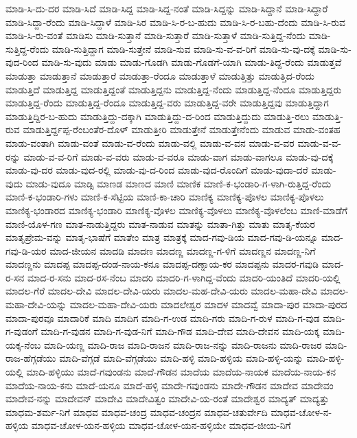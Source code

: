 ಮಾಡಿ-ಸಿ-ದು-ದರ
ಮಾಡಿ-ಸಿದೆ
ಮಾಡಿ-ಸಿದ್ದ
ಮಾಡಿ-ಸಿದ್ದ-ನಂತೆ
ಮಾಡಿ-ಸಿದ್ದನ್ನು
ಮಾಡಿ-ಸಿದ್ದಾನೆ
ಮಾಡಿ-ಸಿದ್ದಾರೆ
ಮಾಡಿ-ಸಿದ್ದಾ-ರೆಂದು
ಮಾಡಿ-ಸಿದ್ದಾಳೆ
ಮಾಡಿ-ಸಿರ
ಮಾಡಿ-ಸಿ-ರ-ಬ-ಹುದು
ಮಾಡಿ-ಸಿ-ರ-ಬಹು-ದೆಂದು
ಮಾಡಿ-ಸಿ-ರುವ
ಮಾಡಿ-ಸಿ-ರು-ವಂತೆ
ಮಾಡಿಸು
ಮಾಡಿ-ಸುತ್ತಾನೆ
ಮಾಡಿ-ಸುತ್ತಾರೆ
ಮಾಡಿ-ಸುತ್ತಾಳೆ
ಮಾಡಿ-ಸುತ್ತಿದ್ದ-ನೆಂದು
ಮಾಡಿ-ಸುತ್ತಿದ್ದ-ರೆಂದು
ಮಾಡಿ-ಸುತ್ತಿದ್ದಾಗ
ಮಾಡಿ-ಸುತ್ತೇನೆ
ಮಾಡಿ-ಸುವ
ಮಾಡಿ-ಸು-ವ-ವ-ರಿಗೆ
ಮಾಡಿ-ಸು-ವು-ದಕ್ಕೆ
ಮಾಡಿ-ಸು-ವುದ-ರಿಂದ
ಮಾಡಿ-ಸು-ವುದು
ಮಾಡು
ಮಾಡು-ಗೊಡಗಿ
ಮಾಡು-ಗೊಡಗೆ-ಯಾಗಿ
ಮಾಡು-ತಿದ್ದ-ರೆಂದು
ಮಾಡುತ್ತವೆ
ಮಾಡುತ್ತಾ
ಮಾಡುತ್ತಾನೆ
ಮಾಡುತ್ತಾರೆ
ಮಾಡುತ್ತಾ-ರೆಂದೂ
ಮಾಡುತ್ತಾಳೆ
ಮಾಡುತ್ತಿತ್ತು
ಮಾಡುತ್ತಿದ-ರೆಂದು
ಮಾಡುತ್ತಿದೆ
ಮಾಡುತ್ತಿದ್ದ
ಮಾಡುತ್ತಿದ್ದಂತೆ
ಮಾಡುತ್ತಿದ್ದನು
ಮಾಡುತ್ತಿದ್ದ-ನೆಂದು
ಮಾಡುತ್ತಿದ್ದ-ನೆಂದೂ
ಮಾಡುತ್ತಿದ್ದರು
ಮಾಡುತ್ತಿದ್ದ-ರೆಂದು
ಮಾಡುತ್ತಿದ್ದ-ರೆಂದೂ
ಮಾಡುತ್ತಿದ್ದ-ವರು
ಮಾಡುತ್ತಿದ್ದ-ವರೇ
ಮಾಡುತ್ತಿದ್ದವು
ಮಾಡುತ್ತಿದ್ದಾಗ
ಮಾಡುತ್ತಿದ್ದಿರ-ಬ-ಹುದು
ಮಾಡುತ್ತಿದ್ದು-ದಕ್ಕಾಗಿ
ಮಾಡುತ್ತಿದ್ದು-ದ-ರಿಂದ
ಮಾಡುತ್ತಿದ್ದುದು
ಮಾಡುತ್ತಿ-ರಲು
ಮಾಡುತ್ತಿ-ರುವ
ಮಾಡುತ್ತಿರ್ದ್ದಪ್ಪ-ರೆಂಬಂತೆರ-ದೊಳ್
ಮಾಡುತ್ತೀರಿ
ಮಾಡುತ್ತೇನೆ
ಮಾಡುತ್ತೇನೆಂದು
ಮಾಡುವ
ಮಾಡು-ವಂತಹ
ಮಾಡು-ವಂತಾಗಿ
ಮಾಡು-ವಂತೆ
ಮಾಡು-ವ-ರೆಂದು
ಮಾಡು-ವಲ್ಲಿ
ಮಾಡು-ವ-ವನ
ಮಾಡು-ವ-ವರ
ಮಾಡು-ವ-ವ-ರನ್ನು
ಮಾಡು-ವ-ವ-ರಿಗೆ
ಮಾಡು-ವ-ವರು
ಮಾಡು-ವ-ವರೂ
ಮಾಡು-ವಾಗ
ಮಾಡು-ವಾಗಲೂ
ಮಾಡು-ವು-ದಕ್ಕೆ
ಮಾಡು-ವು-ದರ
ಮಾಡು-ವುದ-ರಲ್ಲಿ
ಮಾಡು-ವು-ದ-ರಿಂದ
ಮಾಡು-ವುದ-ರೊಂದಿಗೆ
ಮಾಡು-ವುದಾ-ದರೆ
ಮಾಡು-ವುದು
ಮಾಡು-ವುದೂ
ಮಾಡ್ಸಿ
ಮಾಣಡ
ಮಾಣದ
ಮಾಣಿ
ಮಾಣಿಕ
ಮಾಣಿ-ಕ-ಭಂಡಾರಿ-ಗ-ಳಾಗಿ-ರುತ್ತಿದ್ದ-ರೆಂದು
ಮಾಣಿ-ಕ-ಭಂಡಾರಿ-ಗಳು
ಮಾಣಿ-ಕ-ಸೆಟ್ಟಿಯ
ಮಾಣಿ-ಕಾ-ಚಾರಿ
ಮಾಣಿಕ್ಯ
ಮಾಣಿಕ್ಯ-ಪೊಳಲ
ಮಾಣಿಕ್ಯ-ಪೊಳಲು
ಮಾಣಿಕ್ಯ-ಭಂಡಾರದ
ಮಾಣಿಕ್ಯ-ಭಂಡಾರಿ
ಮಾಣಿಕ್ಯ-ವೊಳಲ
ಮಾಣಿಕ್ಯ-ವೊಳಲು
ಮಾಣಿಕ್ಯ-ವೊಳಲೆಂಬ
ಮಾಣಿ-ಮಾಡೆಗೆ
ಮಾಣಿ-ಯೊಳ-ಗಣ
ಮಾತ-ನಾಡುತ್ತಿದ್ದರು
ಮಾತ-ನಾಡುವ
ಮಾತನ್ನು
ಮಾತಾ-ಗಿತ್ತು
ಮಾತು
ಮಾತೃ-ಕೆಯರ
ಮಾತೃಪ್ರೇಮ-ವನ್ನು
ಮಾತೃ-ಭಾಷೆಗೆ
ಮಾತೇಂ
ಮಾತ್ರ
ಮಾತ್ರಕ್ಕೆ
ಮಾದ-ಗವು-ಡಿಯ
ಮಾದ-ಗವು-ಡಿ-ಯನ್ನೂ
ಮಾದ-ಗವು-ಡಿ-ಯರ
ಮಾದ-ಜೀಯನ
ಮಾದಡಿ
ಮಾದಣ
ಮಾದಣ್ಣ
ಮಾದಣ್ಣ-ಗ-ಳಿಗೆ
ಮಾದಣ್ಣನ
ಮಾದಣ್ಣ-ನಿಗೆ
ಮಾದಣ್ಣನು
ಮಾದಪ್ಪ
ಮಾದಪ್ಪ-ದಂಡ-ನಾಯ-ಕನೂ
ಮಾದಪ್ಪ-ದಣ್ನಾಯ-ಕರ
ಮಾದಪ್ಪನು
ಮಾದರ-ಗವುಡಿ
ಮಾದ-ರ-ಸನ
ಮಾದ-ರ-ಸನು
ಮಾದ-ರಸ-ನೆಂಬ
ಮಾದರಿ
ಮಾದರಿ-ಗ-ಳಾಗಿದ್ದ-ವೆಂದು
ಮಾದರಿ-ಯಂತಿದೆ
ಮಾದರಿ-ಯಲ್ಲಿ
ಮಾದಲ-ಗೆರೆ
ಮಾದಲ-ದೇವಿ
ಮಾದಲ-ದೇವಿ-ಯರು
ಮಾದಲ-ಮಹ-ದೇವಿ-ಯರು
ಮಾದಲ-ಮಹಾ-ದೇವಿ
ಮಾದಲ-ಮಹಾ-ದೇವಿ-ಯನ್ನು
ಮಾದಲ-ಮಹಾ-ದೇವಿ-ಯರು
ಮಾದಲೇಶ್ವರ
ಮಾದಳ
ಮಾದವ್ವೆ
ಮಾದಾ-ಪುರ
ಮಾದಾ-ಪುರದ
ಮಾದಾ-ಪುರವೂ
ಮಾದಾರಿಕೆ
ಮಾದಿ
ಮಾದಿಗ
ಮಾದಿ-ಗ-ಉಡ
ಮಾದಿ-ಗರು
ಮಾದಿ-ಗ-ರುಳ
ಮಾದಿ-ಗ-ವುಡ
ಮಾದಿ-ಗ-ವುಡಂಗೆ
ಮಾದಿ-ಗ-ವುಡನ
ಮಾದಿ-ಗ-ವುಡ-ನಿಗೆ
ಮಾದಿ-ಗೌಡ
ಮಾದಿ-ದೇವ
ಮಾದಿ-ದೇವನ
ಮಾದಿ-ಯಕ್ಕ
ಮಾದಿ-ಯಕ್ಕ-ನೆಂಬ
ಮಾದಿ-ಯಣ್ಣ
ಮಾದಿ-ರಾಜ
ಮಾದಿ-ರಾಜನ
ಮಾದಿ-ರಾಜ-ನನ್ನು
ಮಾದಿ-ರಾಜನು
ಮಾದಿ-ರಾಜರ
ಮಾದಿ-ರಾಜ-ಹೆಗ್ಗಡೆಯು
ಮಾದಿ-ವೆಗ್ಗಡೆ
ಮಾದಿ-ವೆಗ್ಗಡೆಯು
ಮಾದಿ-ಹಳ್ಳಿ
ಮಾದಿ-ಹಳ್ಳಿಯ
ಮಾದಿ-ಹಳ್ಳಿ-ಯನ್ನು
ಮಾದಿ-ಹಳ್ಳಿ-ಯಲ್ಲಿ
ಮಾದಿ-ಹಳ್ಳಿಯು
ಮಾದೆ-ಗವುಂಡನು
ಮಾದೆ-ಗೌಡನ
ಮಾದೆಯ
ಮಾದೆಯ-ನಾಯಕ
ಮಾದೆಯ-ನಾಯ-ಕನ
ಮಾದೆಯ-ನಾಯ-ಕನು
ಮಾದೆ-ಯನೂ
ಮಾದೆ-ಹಳ್ಳಿ
ಮಾದೇ-ಗವುಂಡನು
ಮಾದೇ-ಗೌಡನ
ಮಾದೇವ
ಮಾದೇವಂ
ಮಾದೇವ-ನನ್ನು
ಮಾದೇವನ್
ಮಾದೇವಿ
ಮಾದೇವಿತ್ವಂ
ಮಾದೇವಿ-ಯ-ರಂತೆ
ಮಾದೇಶ್ವರ
ಮಾದ್ಯತ್
ಮಾದ್ಯತ್ತು
ಮಾಧಮ-ಶರ್ಮ-ನಿಗೆ
ಮಾಧವ
ಮಾಧವ-ಚಂದ್ರ
ಮಾಧವ-ಚಂದ್ರನ
ಮಾಧವ-ಚತುರ್ವೇದಿ
ಮಾಧವ-ಚೋಳ-ನ-ಹಳ್ಳಿಯ
ಮಾಧವ-ಚೋಳ-ಯನ-ಹಳ್ಳಿಯ
ಮಾಧವ-ಚೋಳ-ಯನ-ಹಳ್ಳಿಯೇ
ಮಾಧವ-ಜೀಯ-ನಿಗೆ
